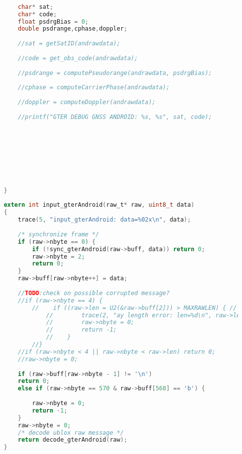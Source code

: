 \begin{lstlisting}[language=c]
		
		
		char* sat;
		char* code;
		float psdrgBias = 0;
		double psdrange,cphase,doppler;
		
		//sat = getSatID(andrawdata);
		
		//code = get_obs_code(andrawdata);
		
		//psdrange = computePseudorange(andrawdata, psdrgBias);
		
		//cphase = computeCarrierPhase(andrawdata);
		
		//doppler = computeDoppler(andrawdata);
		
		//printf("GTER DEBUG GNSS ANDROID: %s, %s", sat, code);
		
		
		
		
		
		
		
		
		
	}
	
	extern int input_gterAndroid(raw_t* raw, uint8_t data)
	{
		trace(5, "input_gterAndroid: data=%02x\n", data);
		
		/* synchronize frame */
		if (raw->nbyte == 0) {
			if (!sync_gterAndroid(raw->buff, data)) return 0;
			raw->nbyte = 2;
			return 0;
		}
		raw->buff[raw->nbyte++] = data;
		
		//TODO:check on possible corrupted message?
		//if (raw->nbyte == 4) {
			//    if ((raw->len = U2(&raw->buff[2])) > MAXRAWLEN) { // warning: modify this
				//        trace(2, "ay length error: len=%d\n", raw->len);
				//        raw->nbyte = 0;
				//        return -1;
				//    }
			//}
		//if (raw->nbyte < 4 || raw->nbyte < raw->len) return 0;
		//raw->nbyte = 0;
		
		if (raw->buff[raw->nbyte - 1] != '\n')
		return 0;
		else if (raw->nbyte == 570 & raw->buff[568] == 'b') {
			
			raw->nbyte = 0;
			return -1;
		}
		raw->nbyte = 0;
		/* decode ublox raw message */
		return decode_gterAndroid(raw);
	}
	
\end{lstlisting}